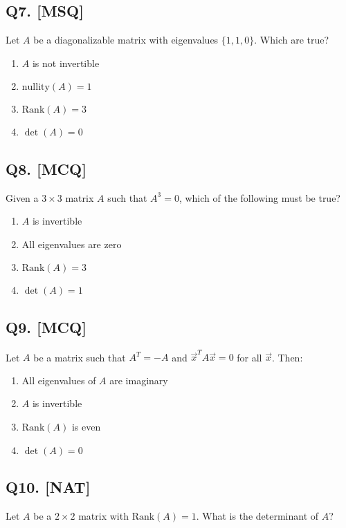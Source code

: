 \subsection*{Q7. [MSQ]}
Let $A$ be a diagonalizable matrix with eigenvalues $\{1, 1, 0\}$. Which are true?

\begin{enumerate}[label=(\alph*)]
    \item $A$ is not invertible
    \item $\text{nullity}(A) = 1$
    \item $\text{Rank}(A) = 3$
    \item $\det(A) = 0$
\end{enumerate}

\subsection*{Q8. [MCQ]}
Given a $3 \times 3$ matrix $A$ such that $A^3 = 0$, which of the following must be true?

\begin{enumerate}[label=(\alph*)]
    \item $A$ is invertible
    \item All eigenvalues are zero
    \item $\text{Rank}(A) = 3$
    \item $\det(A) = 1$
\end{enumerate}

\subsection*{Q9. [MCQ]}
Let $A$ be a matrix such that $A^T = -A$ and $\vec{x}^T A \vec{x} = 0$ for all $\vec{x}$. Then:

\begin{enumerate}[label=(\alph*)]
    \item All eigenvalues of $A$ are imaginary
    \item $A$ is invertible
    \item $\text{Rank}(A)$ is even  
    \item $\det(A) = 0$
\end{enumerate}

\subsection*{Q10. [NAT]}
Let $A$ be a $2 \times 2$ matrix with $\text{Rank}(A) = 1$. What is the determinant of $A$?

